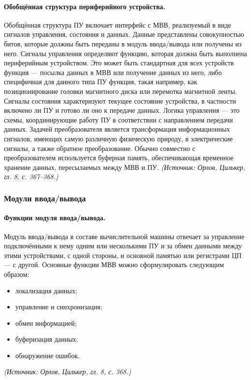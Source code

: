 \documentclass[a4paper,12pt]{article}
\begin{document}
\paragraph{Обобщённая структура периферийного устройства.}
Обобщённая структура ПУ включает интерфейс с МВВ, реализуемый в виде сигналов управления, состояния и данных. Данные представлены совокупностью битов, которые должны быть переданы в модуль ввода/вывода или получены из него. Сигналы управления определяют функцию, которая должна быть выполнена периферийным устройством. Это может быть стандартная для всех устройств функция — посылка данных в МВВ или получение данных из него, либо специфичная для данного типа ПУ функция, такая например, как позиционирование головки магнитного диска или перемотка магнитной ленты. Сигналы состояния характеризуют текущее состояние устройства, в частности включено ли ПУ и готово ли оно к передаче данных. Логика управления — это схемы, координирующие работу ПУ в соответствии с направлением передачи данных. Задачей преобразователя является трансформация информационных сигналов, имеющих самую различную физическую природу, в электрические сигналы, а также обратное преобразование. Обычно совместно с преобразователем используется буферная память, обеспечивающая временное хранение данных, пересылаемых между МВВ и ПУ.
\textit{(Источник: Орлов, Цилькер, гл. 8, с. 367--368.)}

\subsubsection{Модули ввода/вывода}

\paragraph{Функции модуля ввода/вывода.}
Модуль ввода/вывода в составе вычислительной машины отвечает за управление подключёнными к нему одним или несколькими ПУ и за обмен данными между этими устройствами, с одной стороны, и основной памятью или регистрами ЦП — с другой. Основные функции МВВ можно сформулировать следующим образом:
\begin{itemize}
\item локализация данных;
\item управление и синхронизация;
\item обмен информацией;
\item буферизация данных;
\item обнаружение ошибок.
\end{itemize}
\textit{(Источник: Орлов, Цилькер, гл. 8, с. 368.)}
\end{document}
